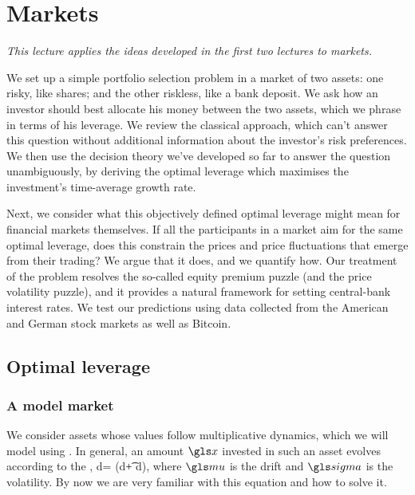 \newpage

\section{Markets}

{\it This lecture applies the ideas developed in the first two lectures to markets. 

We set up a simple portfolio selection problem in a market of two assets: one risky, like shares; and the other riskless, like a bank deposit. We ask how an investor should best allocate his money between the two assets, which we phrase in terms of his leverage. We review the classical approach, which can't answer this question without additional information about the investor's risk preferences. We then use the decision theory we've developed so far to answer the question unambiguously, by deriving the optimal leverage which maximises the investment's time-average growth rate.

Next, we consider what this objectively defined optimal leverage might mean for financial markets themselves. If all the participants in a market aim for the same optimal leverage, does this constrain the prices and price fluctuations that emerge from their trading? We argue that it does, and we quantify how. Our treatment of the problem resolves the so-called equity premium puzzle (and the price volatility puzzle), and it provides a natural framework for setting central-bank interest rates.
We test our predictions using data collected from the American and German stock markets as well as Bitcoin.
}

\newpage


\subsection{Optimal leverage}

\subsubsection{A model market}
We consider assets whose values follow multiplicative dynamics, which we will model using \GBM. In general, an amount $\x$ invested in such an asset evolves according to the \SDE,
\be
d\x = \x(\gmu d\t + \gsigma d\gW),
\ee
where $\gmu$ is the drift and $\gsigma$ is the volatility. By now we are very familiar with this equation and how to solve it.

